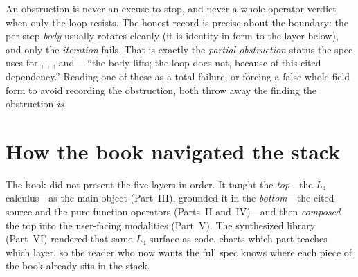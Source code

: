 \begin{pitfall}
An obstruction is never an excuse to stop, and never a whole-operator verdict when
only the loop resists. The honest record is precise about the boundary: the per-step
\emph{body} usually rotates cleanly (it is identity-in-form to the layer below), and
only the \emph{iteration} fails. That is exactly the \emph{partial-obstruction} status
the spec uses for , , , and
---``the body lifts; the loop does not, because of this cited
dependency.'' Reading one of these as a total failure, or forcing a false whole-field
form to avoid recording the obstruction, both throw away the finding the obstruction
\emph{is}.
\end{pitfall}

\section{How the book navigated the stack}
\label{sec:appnavigation}

The book did not present the five layers in order. It taught the \emph{top}---the $L_4$
calculus---as the main object (Part~III), grounded it in the \emph{bottom}---the cited
source and the pure-function operators (Parts~II and~IV)---and then \emph{composed} the
top into the user-facing modalities (Part~V). The synthesized library (Part~VI)
rendered that same $L_4$ surface as code.  charts which part teaches
which layer, so the reader who now wants the full spec knows where each piece of the
book already sits in the stack.

